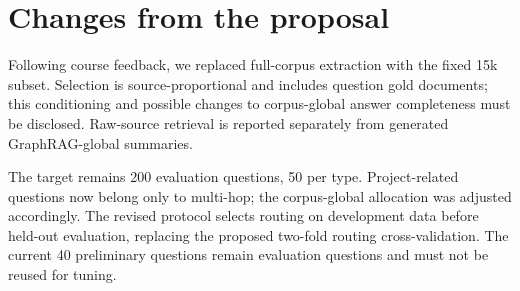 \documentclass[conference]{IEEEtran}
\begin{document}
\section{Changes from the proposal}
Following course feedback, we replaced full-corpus extraction with the fixed
15k subset. Selection is source-proportional and includes question gold
documents; this conditioning and possible changes to corpus-global answer
completeness must be disclosed. Raw-source retrieval is reported separately from generated
GraphRAG-global summaries.

The target remains 200 evaluation questions, 50 per type. Project-related
questions now belong only to multi-hop; the corpus-global allocation was
adjusted accordingly. The revised protocol selects routing on development
data before held-out evaluation, replacing the proposed two-fold routing
cross-validation. The current 40 preliminary questions remain evaluation
questions and must not be reused for tuning.
\end{document}
